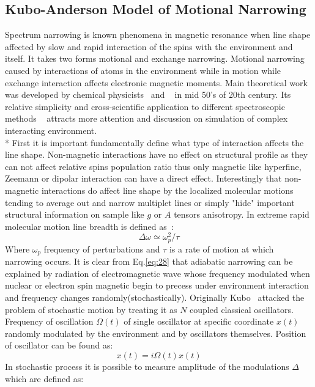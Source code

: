 \subsection{Kubo-Anderson Model of Motional Narrowing}
Spectrum narrowing is known phenomena in magnetic resonance when line shape affected by slow and rapid interaction of the spins with the environment and itself. It takes two forms motional and exchange narrowing. Motional narrowing caused by interactions of atoms in the environment while in motion while exchange interaction affects electronic magnetic moments. Main theoretical work was developed by chemical physicists~\cite{anderson} and ~\cite{kubo} in mid 50's of 20th century. Its relative simplicity and cross-scientific application to different spectroscopic methods ~\cite{inda} attracts more attention and discussion on simulation of complex interacting environment.\\*
First it is important fundamentally define what type of interaction affects the line shape. Non-magnetic interactions have no effect on structural profile as they can not affect relative spins population ratio thus only magnetic like hyperfine, Zeemann or dipolar interaction can have a direct effect. Interestingly that non-magnetic interactions do affect line shape by the localized molecular motions tending to average out and narrow multiplet lines or simply "hide" important structural information on sample like $g$ or $A$ tensors anisotropy. In extreme rapid molecular motion line breadth is defined as~\cite{anderson}: 
\begin{equation}\label{eq:28}
\Delta\omega\simeq \omega_p^2/\tau
\end{equation} 
Where $\omega_p$ frequency of perturbations and $\tau$ is a rate of motion at which narrowing occurs. It is clear from Eq.\ref{eq:28} that adiabatic narrowing can be explained by radiation of electromagnetic wave whose frequency modulated when nuclear or electron spin magnetic begin to precess under environment interaction and frequency changes randomly(stochastically). Originally Kubo~\cite[pp:101-126]{kubo1} attacked the problem of stochastic motion by treating it as $N$ coupled classical oscillators. Frequency of oscillation $\Omega(t)$ of single oscillator at specific coordinate $x(t)$ randomly modulated by the environment and by oscillators themselves. Position of oscillator can be found as: 
\begin{equation}\label{eq:oscill}
x(t)=i\Omega(t)x(t)
\end{equation} 
In stochastic process it is possible to measure amplitude of the modulations $\Delta$ which are defined as:

